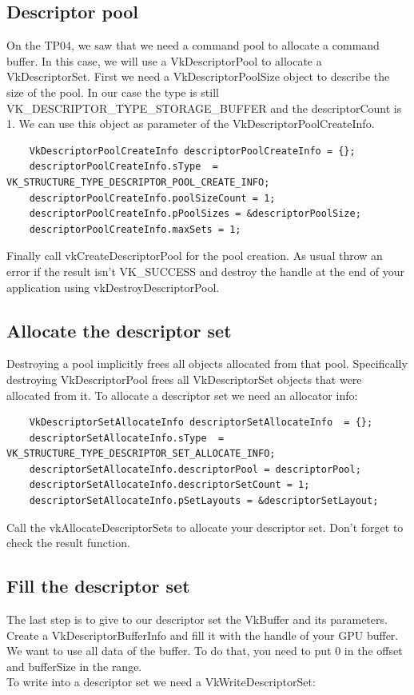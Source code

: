 \documentclass{article}
\begin{document}
\subsection{Descriptor pool}
On the TP04, we saw that we need a command pool to allocate a command buffer. In this case, we will use a VkDescriptorPool to allocate a VkDescriptorSet. First we need a VkDescriptorPoolSize object to describe the size of the pool. In our case the type is still VK\_DESCRIPTOR\_TYPE\_STORAGE\_BUFFER and the descriptorCount is 1. We can use this object as parameter of the VkDescriptorPoolCreateInfo.

\begin{lstlisting}
	VkDescriptorPoolCreateInfo descriptorPoolCreateInfo = {};
	descriptorPoolCreateInfo.sType  = VK_STRUCTURE_TYPE_DESCRIPTOR_POOL_CREATE_INFO;
	descriptorPoolCreateInfo.poolSizeCount = 1;
	descriptorPoolCreateInfo.pPoolSizes = &descriptorPoolSize;
	descriptorPoolCreateInfo.maxSets = 1;
\end{lstlisting}

Finally call vkCreateDescriptorPool for the pool creation. As usual throw an error if the result isn't VK\_SUCCESS and destroy the handle at the end of your application using vkDestroyDescriptorPool.

\subsection{Allocate the descriptor set}
Destroying a pool implicitly frees all objects allocated from that pool. Specifically destroying VkDescriptorPool frees all VkDescriptorSet objects that were allocated from it. To allocate a descriptor set we need an allocator info:
\begin{lstlisting}
	VkDescriptorSetAllocateInfo descriptorSetAllocateInfo  = {};
	descriptorSetAllocateInfo.sType  = VK_STRUCTURE_TYPE_DESCRIPTOR_SET_ALLOCATE_INFO;
	descriptorSetAllocateInfo.descriptorPool = descriptorPool;
	descriptorSetAllocateInfo.descriptorSetCount = 1;
	descriptorSetAllocateInfo.pSetLayouts = &descriptorSetLayout;
\end{lstlisting}
Call the vkAllocateDescriptorSets to allocate your descriptor set. Don't forget to check the result function.

\subsection{Fill the descriptor set}
The last step is to give to our descriptor set the VkBuffer and its parameters. Create a VkDescriptorBufferInfo and fill it with the handle of your GPU buffer. We want to use all data of the buffer. To do that, you need to put 0 in the offset and bufferSize in the range.\\
To write into a descriptor set we need a VkWriteDescriptorSet:
\end{document}
